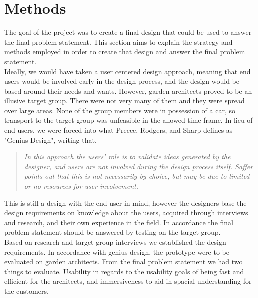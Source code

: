 \chapter{Methods}
\label{chp:methods}
The goal of the project was to create a final design that could be used to answer the final problem statement. This section aims to explain the strategy and methods employed in order to create that design and answer the final problem statement.\\

Ideally, we would have taken a user centered design approach, meaning that end users would be involved early in the design process, and the design would be based around their needs and wants. However, garden architects proved to be an illusive target group. There were not very many of them and they were spread over large areas. None of the group members were in possession of a car, so transport to the target group was unfeasible in the allowed time frame. In lieu of end users, we were forced into what Preece, Rodgers, and Sharp defines as "Genius Design"\cite[p.~346]{interactionDesign}, writing that.\\
	\begin{quote}
	\textit{In this approach the users’ role is to validate ideas generated by the designer, and users are not involved during the design process itself. Saffer points out that this is not necessarily by choice, but may be due to limited or no resources for user involvement.}\\
	\end{quote}

This is still a design with the end user in mind, however the designers base the design requirements on knowledge about the users, acquired through interviews and research, and their own experience in the field. In accordance the final problem statement should be answered by testing on the target group.\\

Based on research and target group interviews we established the design requirements. In accordance with genius design, the prototype were to be evaluated on garden architects. From the final problem statement we had two things to evaluate. Usability in regards to the usability goals of being fast and efficient for the architects, and immersiveness to aid in spacial understanding for the customers.

